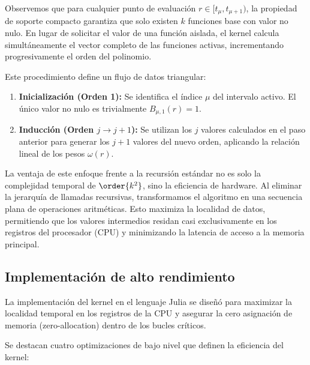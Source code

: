 Observemos que para cualquier punto de evaluación \( r \in [t_{\mu}, t_{\mu + 1}) \), la propiedad de soporte compacto garantiza que solo existen \( k \) funciones base con valor no nulo. En lugar de solicitar el valor de una función aislada, el kernel calcula simultáneamente el vector completo de las funciones activas, incrementando progresivamente el orden del polinomio.

Este procedimiento define un flujo de datos triangular:

\begin{enumerate}
    \item \textbf{Inicialización (Orden 1):} Se identifica el índice \( \mu \) del intervalo activo. El único valor no nulo es trivialmente \( B_{\mu,1}(r) = 1 \).
    
    \item \textbf{Inducción (Orden \( j \to j+1 \)):} Se utilizan los \( j \) valores calculados en el paso anterior para generar los \( j+1 \) valores del nuevo orden, aplicando la relación lineal de los pesos \( \omega(r) \).
\end{enumerate}

La ventaja de este enfoque frente a la recursión estándar no es solo la complejidad temporal de \( \order{k^2} \), sino la eficiencia de hardware. Al eliminar la jerarquía de llamadas recursivas, transformamos el algoritmo en una secuencia plana de operaciones aritméticas. Esto maximiza la localidad de datos, permitiendo que los valores intermedios residan casi exclusivamente en los registros del procesador (CPU) y minimizando la latencia de acceso a la memoria principal.

\subsection{Implementación de alto rendimiento}

La implementación del kernel en el lenguaje Julia se diseñó para maximizar la localidad temporal en los registros de la CPU y asegurar la cero asignación de memoria (zero-allocation) dentro de los bucles críticos.

Se destacan cuatro optimizaciones de bajo nivel que definen la eficiencia del kernel:

